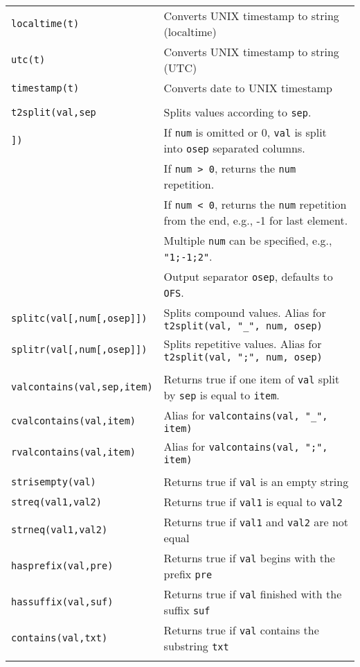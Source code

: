 \documentclass[documentation]{subfiles}
\begin{document}
\begin{longtable}{ll}
    {\tt localtime(t)} & Converts UNIX timestamp to string (localtime)\\
    {\tt utc(t)}       & Converts UNIX timestamp to string (UTC)\\
    {\tt timestamp(t)} & Converts date to UNIX timestamp\\\\

    {\tt t2split(val,sep}          & Splits values according to {\tt sep}.\\
    {\tt\qquad [,num[,osep]])}     & If {\tt num} is omitted or 0, {\tt val} is split into {\tt osep} separated columns.\\
                                   & If {\tt num > 0}, returns the {\tt num} repetition.\\
                                   & If {\tt num < 0}, returns the {\tt num} repetition from the end, e.g., -1 for last element.\\
                                   & Multiple {\tt num} can be specified, e.g., {\tt "1;-1;2"}.\\
                                   & Output separator {\tt osep}, defaults to {\tt OFS}.\\
    {\tt splitc(val[,num[,osep]])} & Splits compound values. Alias for {\tt t2split(val, "\_", num, osep)}\\
    {\tt splitr(val[,num[,osep]])} & Splits repetitive values. Alias for {\tt t2split(val, ";", num, osep)}\\\\

    {\tt valcontains(val,sep,item)} & Returns true if one item of {\tt val} split by {\tt sep} is equal to {\tt item}.\\
    {\tt cvalcontains(val,item)}    & Alias for {\tt valcontains(val, "\_", item)}\\
    {\tt rvalcontains(val,item)}    & Alias for {\tt valcontains(val, ";", item)}\\\\

    {\tt strisempty(val)}     & Returns true if {\tt val} is an empty string\\
    {\tt streq(val1,val2)}    & Returns true if {\tt val1} is equal to {\tt val2}\\
    {\tt strneq(val1,val2)}   & Returns true if {\tt val1} and {\tt val2} are not equal\\
    {\tt hasprefix(val,pre)}  & Returns true if {\tt val} begins with the prefix {\tt pre}\\
    {\tt hassuffix(val,suf)}  & Returns true if {\tt val} finished with the suffix {\tt suf}\\
    {\tt contains(val,txt)}   & Returns true if {\tt val} contains the substring {\tt txt}\\\\


\end{longtable}
\end{document}
